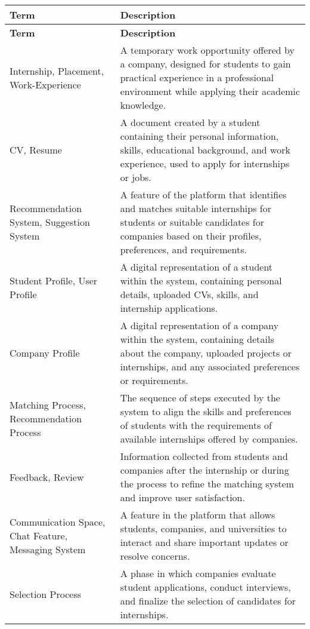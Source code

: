     \begin{longtable}{|p{}|p{}|}
        \hline
        \textbf{Term} & \textbf{Description} \\
        \hline
        \endfirsthead
        \hline
        \textbf{Term} & \textbf{Description} \\
        \hline
        \endhead
        \hline
        \endfoot
        
        Internship, Placement, Work-Experience & A temporary work opportunity offered by a company, designed for students to gain practical experience in a professional environment while applying their academic knowledge. \\
        \hline
        CV, Resume & A document created by a student containing their personal information, skills, educational background, and work experience, used to apply for internships or jobs. \\
        \hline
        Recommendation System, Suggestion System & A feature of the platform that identifies and matches suitable internships for students or suitable candidates for companies based on their profiles, preferences, and requirements. \\
        \hline
        Student Profile, User Profile & A digital representation of a student within the system, containing personal details, uploaded CVs, skills, and internship applications. \\
        \hline
        Company Profile & A digital representation of a company within the system, containing details about the company, uploaded projects or internships, and any associated preferences or requirements. \\
        \hline
        Matching Process, Recommendation Process & The sequence of steps executed by the system to align the skills and preferences of students with the requirements of available internships offered by companies. \\
        \hline
        Feedback, Review & Information collected from students and companies after the internship or during the process to refine the matching system and improve user satisfaction. \\
        \hline
        Communication Space, Chat Feature, Messaging System & A feature in the platform that allows students, companies, and universities to interact and share important updates or resolve concerns. \\
        \hline
        Selection Process & A phase in which companies evaluate student applications, conduct interviews, and finalize the selection of candidates for internships. \\

\end{longtable}
